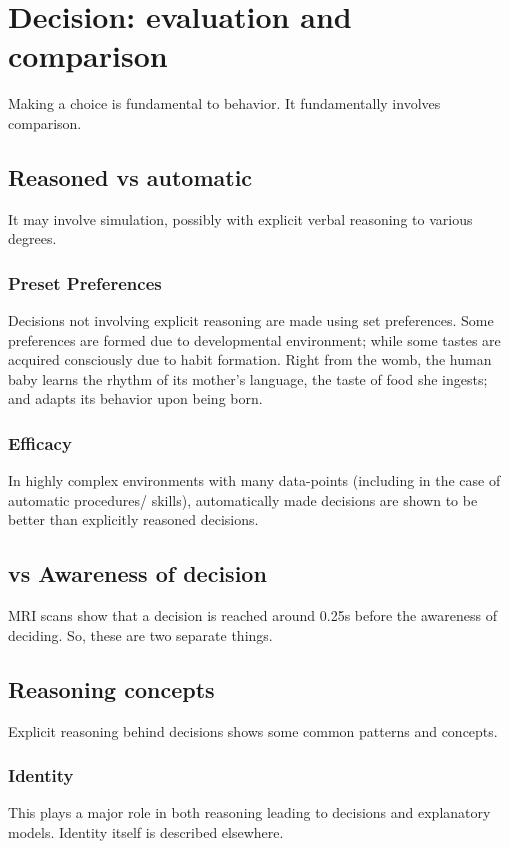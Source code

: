 \documentclass[oneside, article]{memoir}
\begin{document}
\tbc

\chapter{Decision: evaluation and comparison}
Making a choice is fundamental to behavior. It fundamentally involves comparison.

\section{Reasoned vs automatic}
It may involve simulation, possibly with explicit verbal reasoning to various degrees.

\subsection{Preset Preferences}
Decisions not involving explicit reasoning are made using set preferences. Some preferences are formed due to developmental environment; while some tastes are acquired consciously due to habit formation. Right from the womb, the human baby learns the rhythm of its mother's language, the taste of food she ingests; and adapts its behavior upon being born.

\subsection{Efficacy}
In highly complex environments with many data-points (including in the case of automatic procedures/ skills), automatically made decisions are shown to be better than explicitly reasoned decisions.

\section{vs Awareness of decision}
MRI scans show that a decision is reached around 0.25s before the awareness of deciding. So, these are two separate things.

\section{Reasoning concepts}
Explicit reasoning behind decisions shows some common patterns and concepts.

\subsection{Identity}
This plays a major role in both reasoning leading to decisions and explanatory models. Identity itself is described elsewhere.
\end{document}
